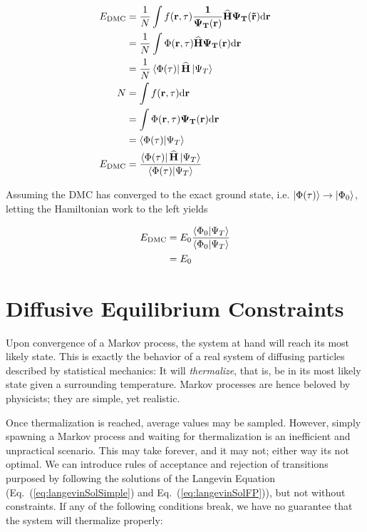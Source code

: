 \begin{align*}
 E_\mathrm{DMC} &= \frac{1}{N}\int f(\bf r, \tau) \frac{1}{\Psi_T(\bf r)} {\bf\widehat{H}} \Psi_T(\vec r) \mathrm{d}\bf r \\
                &= \frac{1}{N}\int \Phi(\bf r, \tau) {\bf\widehat{H}} \Psi_T(\bf r) \mathrm{d}\bf r \\
                &= \frac{1}{N}\left< \Phi(\tau) \right|{\bf\widehat{H}}\left| \Psi_T \right> \\
               N&= \int f(\bf r, \tau) \mathrm{d}\bf r \\
                &= \int \Phi(\bf r, \tau)\Psi_T(\bf r)\mathrm{d}\bf r \\
                &= \left\langle \Phi(\tau) | \Psi_T\right\rangle\\
 E_\mathrm{DMC} &= \frac{\left< \Phi(\tau) \right|{\bf\widehat{H}}\left| \Psi_T \right>}{\left\langle \Phi(\tau) | \Psi_T\right\rangle}\\
\end{align*}

Assuming the DMC has converged to the exact ground state, i.e. $\left| \Phi(\tau) \right>\to\left| \Phi_0 \right>$, letting the Hamiltonian work to the left yields

\begin{align*}
 E_\mathrm{DMC} &= E_0\frac{\left\langle \Phi_0 | \Psi_T\right\rangle}{\left\langle \Phi_0 | \Psi_T\right\rangle} \\
                &= E_0
\end{align*}


\section{Diffusive Equilibrium Constraints}

Upon convergence of a Markov process, the system at hand will reach its most likely state. This is exactly the behavior of a real system of diffusing particles described by statistical mechanics: It will \textit{thermalize}, that is, be in its most likely state given a surrounding temperature. Markov processes are hence beloved by physicists; they are simple, yet realistic. 

Once thermalization is reached, average values may be sampled. However, simply spawning a Markov process and waiting for thermalization is an inefficient and unpractical scenario. This may take forever, and it may not; either way its not optimal. We can introduce rules of acceptance and rejection of transitions purposed by following the solutions of the Langevin Equation (Eq.~(\ref{eq:langevinSolSimple}) and Eq.~(\ref{eq:langevinSolFP})), but not without constraints. If any of the following conditions break, we have no guarantee that the system will thermalize properly:

